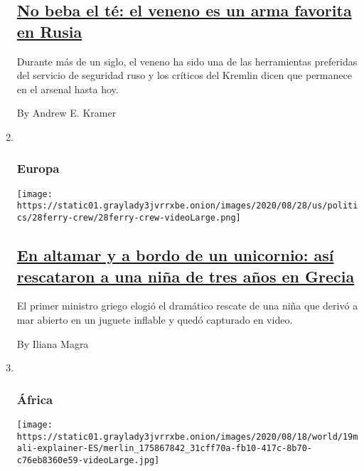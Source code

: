 \begin{enumerate}
{  \subsection{\texorpdfstring{\href{/es/2020/08/21/espanol/mundo/veneno-rusia-navalny-kremlin.html}{No
  beba el té: el veneno es un arma favorita en
  Rusia}}{No beba el té: el veneno es un arma favorita en Rusia}}\label{no-beba-el-tuxe9-el-veneno-es-un-arma-favorita-en-rusia}}

  Durante más de un siglo, el veneno ha sido una de las herramientas
  preferidas del servicio de seguridad ruso y los críticos del Kremlin
  dicen que permanece en el arsenal hasta hoy.

  By Andrew E. Kramer
\item ~
  \hypertarget{europa-3}{%
  \subsubsection{Europa}\label{europa-3}}

  \texttt{[image: https://static01.graylady3jvrrxbe.onion/images/2020/08/28/us/politics/28ferry-crew/28ferry-crew-videoLarge.png]}

  \hypertarget{en-altamar-y-a-bordo-de-un-unicornio-asuxed-rescataron-a-una-niuxf1a-de-tres-auxf1os-en-grecia}{%
  \subsection{\texorpdfstring{\href{/es/2020/08/28/espanol/mundo/unicornio-grecia-rescate-nina-mar.html}{En
  altamar y a bordo de un unicornio: así rescataron a una niña de tres
  años en
  Grecia}}{En altamar y a bordo de un unicornio: así rescataron a una niña de tres años en Grecia}}\label{en-altamar-y-a-bordo-de-un-unicornio-asuxed-rescataron-a-una-niuxf1a-de-tres-auxf1os-en-grecia}}

  El primer ministro griego elogió el dramático rescate de una niña que
  derivó a mar abierto en un juguete inflable y quedó capturado en
  video.

  By Iliana Magra
\item ~
  \hypertarget{uxe1frica}{%
  \subsubsection{África}\label{uxe1frica}}

  \texttt{[image: https://static01.graylady3jvrrxbe.onion/images/2020/08/18/world/19mali-explainer-ES/merlin\_175867842\_31cff70a-fb10-417c-8b70-c76eb8360e59-videoLarge.jpg]}


\end{enumerate}
